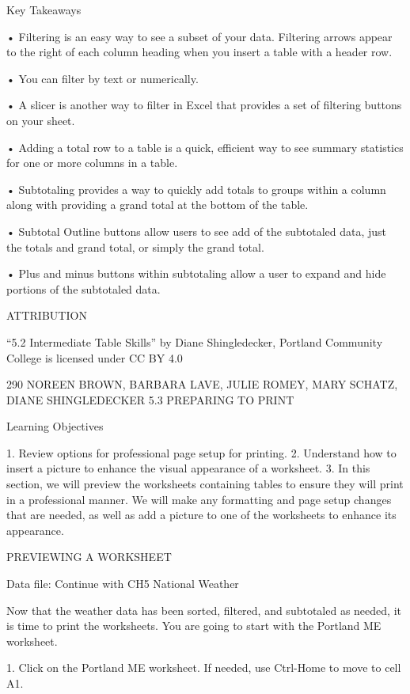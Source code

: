 Key Takeaways


• Filtering is an easy way to see a subset of your data. Filtering arrows appear to the right of each column
heading when you insert a table with a header row.

• You can filter by text or numerically.

• A slicer is another way to filter in Excel that provides a set of filtering buttons on your sheet.

• Adding a total row to a table is a quick, efficient way to see summary statistics for one or more columns in a
table.

• Subtotaling provides a way to quickly add totals to groups within a column along with providing a grand total
at the bottom of the table.

• Subtotal Outline buttons allow users to see add of the subtotaled data, just the totals and grand total, or
simply the grand total.

• Plus and minus buttons within subtotaling allow a user to expand and hide portions of the subtotaled data.



ATTRIBUTION

“5.2 Intermediate Table Skills” by Diane Shingledecker, Portland Community College is licensed
under CC BY 4.0




290 NOREEN BROWN, BARBARA LAVE, JULIE ROMEY, MARY SCHATZ, DIANE SHINGLEDECKER
5.3 PREPARING TO PRINT




Learning Objectives


1. Review options for professional page setup for printing.
2. Understand how to insert a picture to enhance the visual appearance of a worksheet.
3. In this section, we will preview the worksheets containing tables to ensure they will print in a professional
manner. We will make any formatting and page setup changes that are needed, as well as add a picture to
one of the worksheets to enhance its appearance.



PREVIEWING A WORKSHEET

Data file: Continue with CH5 National Weather

Now that the weather data has been sorted, filtered, and subtotaled as needed, it is time to print the
worksheets. You are going to start with the Portland ME worksheet.

1. Click on the Portland ME worksheet. If needed, use Ctrl-Home to move to cell A1.

